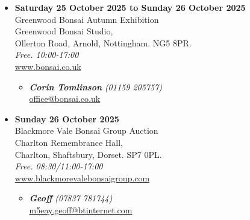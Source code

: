 \begin{itemize}
    \item \textbf{Saturday 25 October 2025 to Sunday 26 October 2025}
    \\
    Greenwood Bonsai Autumn Exhibition \\
    Greenwood Bonsai Studio, \\
    Ollerton Road, Arnold, Nottingham. NG5 8PR.
    \\
    \emph{Free. 10:00-17:00}
    \\
    \href{https://www.bonsai.co.uk}{www.bonsai.co.uk}
    \begin{itemize}
        \item \textbf{\emph{Corin Tomlinson}} \emph{(01159 205757)} \\
        \href{mailto:office@bonsai.co.uk}{office@bonsai.co.uk} 
    \end{itemize}

    \item \textbf{Sunday 26 October 2025}
    \\
    Blackmore Vale Bonsai Group Auction \\
    Charlton Remembrance Hall, \\
    Charlton, Shaftsbury, Dorset. SP7 0PL.
    \\
    \emph{Free. 08:30/11:00-17:00}
    \\
    \href{https://www.blackmorevalebonsaigroup.com}{www.blackmorevalebonsaigroup.com}
    \begin{itemize}
        \item \textbf{\emph{Geoff}} \emph{(07837 781744)} \\
        \href{mailto:m5eay.geoff@btinternet.com}{m5eay.geoff@btinternet.com} 
    \end{itemize}

\end{itemize}
\closearticle